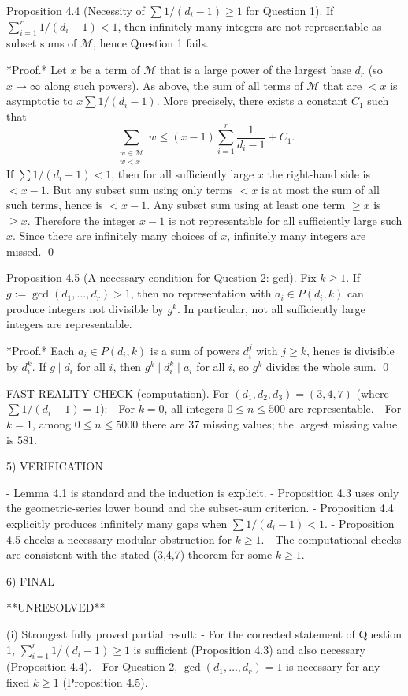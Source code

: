 Proposition 4.4 (Necessity of $\sum 1/(d_i-1)\ge 1$ for Question 1).
If $\sum_{i=1}^r 1/(d_i-1) <1$, then infinitely many integers are not representable as subset sums of $\mathcal{M}$, hence Question 1 fails.

*Proof.* Let $x$ be a term of $\mathcal{M}$ that is a large power of the largest base $d_r$ (so $x\to\infty$ along such powers).
As above, the sum of all terms of $\mathcal{M}$ that are $<x$ is asymptotic to $x\sum 1/(d_i-1)$.
More precisely, there exists a constant $C_1$ such that
\[
\sum_{\substack{w\in\mathcal{M}\\ w<x}} w \le (x-1)\sum_{i=1}^r \frac{1}{d_i-1} + C_1.
\]
If $\sum 1/(d_i-1) <1$, then for all sufficiently large $x$ the right-hand side is $<x-1$.
But any subset sum using only terms $<x$ is at most the sum of all such terms, hence is $<x-1$.
Any subset sum using at least one term $\ge x$ is $\ge x$.
Therefore the integer $x-1$ is not representable for all sufficiently large such $x$.
Since there are infinitely many choices of $x$, infinitely many integers are missed. \qed

Proposition 4.5 (A necessary condition for Question 2: gcd).
Fix $k\ge 1$.
If $g:=\gcd(d_1,\dots,d_r)>1$, then no representation with $a_i\in P(d_i,k)$ can produce integers not divisible by $g^k$. In particular, not all sufficiently large integers are representable.

*Proof.* Each $a_i\in P(d_i,k)$ is a sum of powers $d_i^j$ with $j\ge k$, hence is divisible by $d_i^k$.
If $g\mid d_i$ for all $i$, then $g^k\mid d_i^k\mid a_i$ for all $i$, so $g^k$ divides the whole sum. \qed

FAST REALITY CHECK (computation).
For $(d_1,d_2,d_3)=(3,4,7)$ (where $\sum 1/(d_i-1)=1$):
- For $k=0$, all integers $0\le n\le 500$ are representable.
- For $k=1$, among $0\le n\le 5000$ there are $37$ missing values; the largest missing value is $581$.

5) VERIFICATION

- Lemma 4.1 is standard and the induction is explicit.
- Proposition 4.3 uses only the geometric-series lower bound and the subset-sum criterion.
- Proposition 4.4 explicitly produces infinitely many gaps when $\sum 1/(d_i-1)<1$.
- Proposition 4.5 checks a necessary modular obstruction for $k\ge 1$.
- The computational checks are consistent with the stated (3,4,7) theorem for some $k\ge 1$.

6) FINAL

**UNRESOLVED**

(i) Strongest fully proved partial result:
- For the corrected statement of Question 1, $\sum_{i=1}^r 1/(d_i-1)\ge 1$ is sufficient (Proposition 4.3) and also necessary (Proposition 4.4).
- For Question 2, $\gcd(d_1,\dots,d_r)=1$ is necessary for any fixed $k\ge 1$ (Proposition 4.5).

